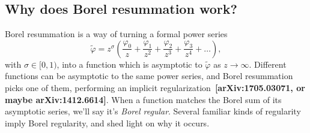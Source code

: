 \documentclass{article}
\newcommand{\series}{\tilde}
\begin{document}
\subsection{Why does Borel resummation work?}
Borel resummation is a way of turning a formal power series
\[ \series{\varphi} = z^\sigma \left( \frac{\varphi_0}{z} + \frac{\varphi_1}{z^2} + \frac{\varphi_2}{z^3} + \frac{\varphi_3}{z^4} + \ldots \right), \]
with $\sigma \in [0, 1)$, into a function which is asymptotic to $\series{\varphi}$ as $z \to \infty$. Different functions can be asymptotic to the same power series, and Borel resummation picks one of them, performing an implicit regularization~\textbf{[arXiv:1705.03071, or maybe arXiv:1412.6614]}. When a function matches the Borel sum of its asymptotic series, we'll say it's {\em Borel regular}. Several familiar kinds of regularity imply Borel regularity, and shed light on why it occurs.
\end{document}
